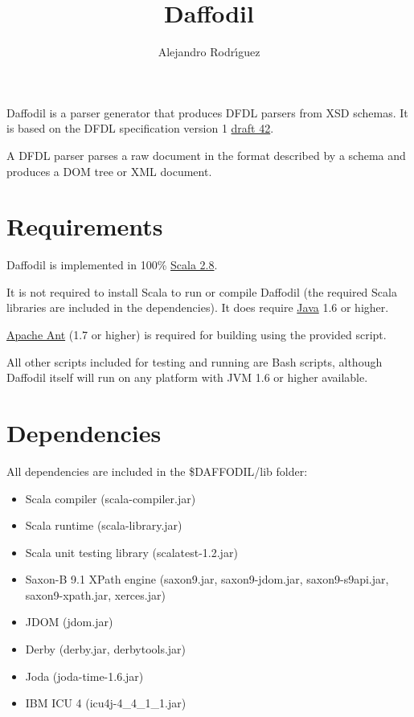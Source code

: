 \documentclass[a4paper,10pt]{article}
\title{Daffodil}
\author{Alejandro Rodr\'{\i}guez}
\begin{document}
\maketitle

Daffodil is a parser generator that produces DFDL parsers from XSD schemas. It is based on the DFDL specification version 1 \href{http://forge.gridforum.org/sf/docman/do/downloadDocument/projects.dfdl-wg/docman.root.current_0/doc16037/2}{draft 42}.

A DFDL parser parses a raw document in the format described by a schema and produces a DOM tree or XML document.

\section{Requirements}

Daffodil is implemented in 100\% \href{http://www.scala-lang.org/}{Scala 2.8}.

It is not required to install Scala to run or compile Daffodil (the required Scala libraries are included in the dependencies). It does require \href{http://www.java.com/en/}{Java} 1.6 or higher.

\href{http://ant.apache.org/}{Apache Ant} (1.7 or higher) is required for building using the provided script.

All other scripts included for testing and running are Bash scripts, although Daffodil itself will run on any platform with JVM 1.6 or higher available.

\section{Dependencies}

All dependencies are included in the \$DAFFODIL/lib folder:

\begin{itemize}
 \item Scala compiler (scala-compiler.jar)
 \item Scala runtime (scala-library.jar)
 \item Scala unit testing library (scalatest-1.2.jar)
 \item Saxon-B 9.1 XPath engine (saxon9.jar, saxon9-jdom.jar, saxon9-s9api.jar, saxon9-xpath.jar, xerces.jar)
 \item JDOM (jdom.jar)
 \item Derby (derby.jar, derbytools.jar)
 \item Joda (joda-time-1.6.jar)
 \item IBM ICU 4 (icu4j-4\_4\_1\_1.jar)                           
\end{itemize}
\end{document}
